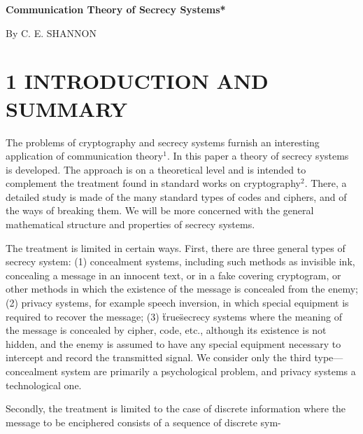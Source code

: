 \documentclass{article}
\begin{document}

\begin{center}
\textbf{Communication Theory of Secrecy Systems*}

By C. E. SHANNON
\end{center}

\section*{1 INTRODUCTION AND SUMMARY}

The problems of cryptography and secrecy systems furnish an interesting application of communication theory$^1$. In this paper a theory of secrecy systems is developed. The approach is on a theoretical level and is intended to complement the treatment found in standard works on cryptography$^2$. There, a detailed study is made of the many standard types of codes and ciphers, and of the ways of breaking them. We will be more concerned with the general mathematical structure and properties of secrecy systems.

The treatment is limited in certain ways. First, there are three general types of secrecy system: (1) concealment systems, including such methods as invisible ink, concealing a message in an innocent text, or in a fake covering cryptogram, or other methods in which the existence of the message is concealed from the enemy; (2) privacy systems, for example speech inversion, in which special equipment is required to recover the message; (3) \"true\" secrecy systems where the meaning of the message is concealed by cipher, code, etc., although its existence is not hidden, and the enemy is assumed to have any special equipment necessary to intercept and record the transmitted signal. We consider only the third type---concealment system are primarily a psychological problem, and privacy systems a technological one.

Secondly, the treatment is limited to the case of discrete information where the message to be enciphered consists of a sequence of discrete sym-
\end{document}
